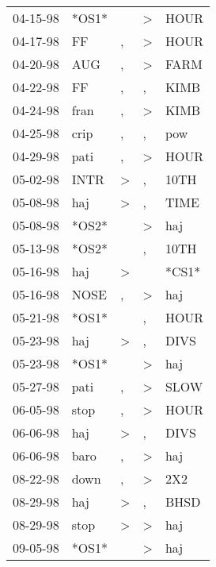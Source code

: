 \begin{supertabular}{lllll}
 04-15-98 &  *OS1* &                  &     \textgreater &   HOUR \\
 04-17-98 &     FF &                , &     \textgreater &   HOUR \\
 04-20-98 &    AUG &                , &     \textgreater &   FARM \\
 04-22-98 &     FF &                , &                , &   KIMB \\
 04-24-98 &   fran &                , &     \textgreater &   KIMB \\
 04-25-98 &   crip &                , &                , &    pow \\
 04-29-98 &   pati &                , &     \textgreater &   HOUR \\
 05-02-98 &   INTR &     \textgreater &                , &   10TH \\
 05-08-98 &    haj &     \textgreater &                , &   TIME \\
 05-08-98 &  *OS2* &                  &     \textgreater &    haj \\
 05-13-98 &  *OS2* &                  &                , &   10TH \\
 05-16-98 &    haj &     \textgreater &                  &  *CS1* \\
 05-16-98 &   NOSE &                , &     \textgreater &    haj \\
 05-21-98 &  *OS1* &                  &                , &   HOUR \\
 05-23-98 &    haj &     \textgreater &                , &   DIVS \\
 05-23-98 &  *OS1* &                  &     \textgreater &    haj \\
 05-27-98 &   pati &                , &     \textgreater &   SLOW \\
 06-05-98 &   stop &                , &     \textgreater &   HOUR \\
 06-06-98 &    haj &     \textgreater &                , &   DIVS \\
 06-06-98 &   baro &                , &     \textgreater &    haj \\
 08-22-98 &   down &                , &     \textgreater &    2X2 \\
 08-29-98 &    haj &     \textgreater &                , &   BHSD \\
 08-29-98 &   stop &     \textgreater &     \textgreater &    haj \\
 09-05-98 &  *OS1* &                  &     \textgreater &    haj \\

\end{supertabular}

